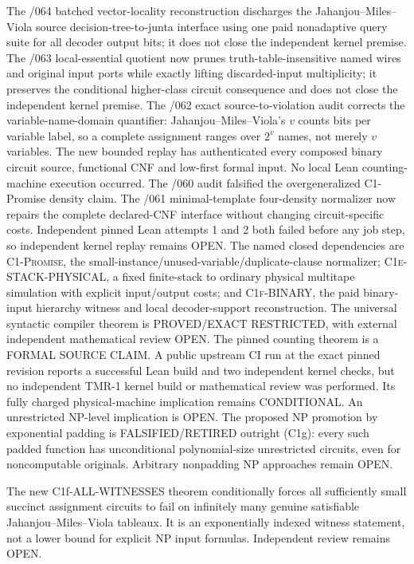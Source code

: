 \documentclass[11pt]{article}
\begin{document}
The /064 batched vector-locality reconstruction discharges the Jahanjou--Miles--Viola source decision-tree-to-junta interface using one paid nonadaptive query suite for all decoder output bits; it does not close the independent kernel premise. The /063 local-essential quotient now prunes truth-table-insensitive named wires and original input ports while exactly lifting discarded-input multiplicity; it preserves the conditional higher-class circuit consequence and does not close the independent kernel premise. The /062 exact source-to-violation audit corrects the variable-name-domain quantifier: Jahanjou--Miles--Viola's $v$ counts bits per variable label, so a complete assignment ranges over $2^v$ names, not merely $v$ variables. The new bounded replay has authenticated every composed binary circuit source, functional CNF and low-first formal input. No local Lean counting-machine execution occurred. The /060 audit falsified the overgeneralized C1-Promise density claim. The /061 minimal-template four-density normalizer now repairs the complete declared-CNF interface without changing circuit-specific costs. Independent pinned Lean attempts 1 and 2 both failed before any job step, so independent kernel replay remains OPEN. The named closed dependencies are \textsc{C1-Promise}, the small-instance/unused-variable/duplicate-clause normalizer; \textsc{C1e-STACK-PHYSICAL}, a fixed finite-stack to ordinary physical multitape simulation with explicit input/output costs; and \textsc{C1f-BINARY}, the paid binary-input hierarchy witness and local decoder-support reconstruction. The universal syntactic compiler theorem is PROVED/EXACT RESTRICTED, with external independent mathematical review OPEN. The pinned counting theorem is a FORMAL SOURCE CLAIM. A public upstream CI run at the exact pinned revision reports a successful Lean build and two independent kernel checks, but no independent TMR-1 kernel build or mathematical review was performed. Its fully charged physical-machine implication remains CONDITIONAL. An unrestricted NP-level implication is OPEN. The proposed NP promotion by exponential padding is FALSIFIED/RETIRED outright (C1g): every such padded function has unconditional polynomial-size unrestricted circuits, even for noncomputable originals. Arbitrary nonpadding NP approaches remain OPEN.

The new C1f-ALL-WITNESSES theorem conditionally forces all sufficiently small succinct assignment circuits to fail on infinitely many genuine satisfiable Jahanjou--Miles--Viola tableaux. It is an exponentially indexed witness statement, not a lower bound for explicit NP input formulas. Independent review remains OPEN.
\end{document}
